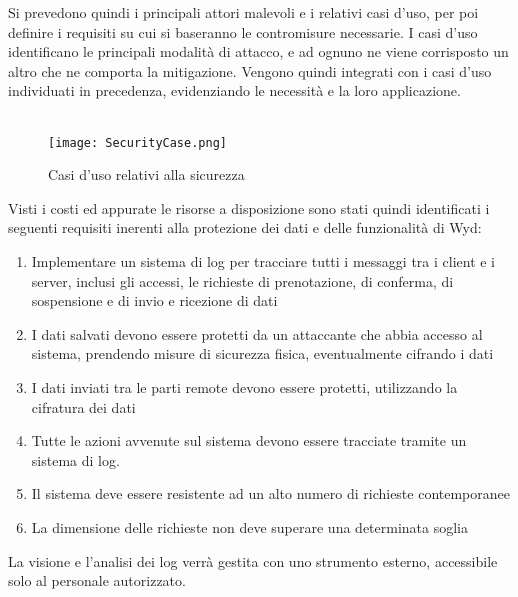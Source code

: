 \clearpage
Si prevedono quindi i principali attori malevoli e i relativi casi d'uso, 
per poi definire i requisiti su cui si baseranno le contromisure necessarie. 
I casi d'uso identificano le principali modalità di attacco, 
e ad ognuno ne viene corrisposto un altro che ne comporta la mitigazione. 
Vengono quindi integrati con i casi d'uso individuati in precedenza, 
evidenziando le necessità e la loro applicazione.\\
\\
\begin{figure}[h!]
    \begin{center}
        \texttt{[image: SecurityCase.png]}
        \caption{Casi d'uso relativi alla sicurezza}
    \end{center}

\end{figure}
\clearpage

Visti i costi ed appurate le risorse a disposizione sono stati quindi identificati i seguenti requisiti 
inerenti alla protezione dei dati e delle funzionalità di Wyd:
\begin{enumerate}
    \item Implementare un sistema di log per tracciare tutti i messaggi tra i client e i server, inclusi gli accessi, le richieste di prenotazione, di conferma, di sospensione e di invio e ricezione di dati
    \item I dati salvati devono essere protetti da un attaccante che abbia accesso al sistema, prendendo misure di sicurezza fisica, eventualmente cifrando i dati
    \item I dati inviati tra le parti remote devono essere protetti, utilizzando la cifratura dei dati
    \item Tutte le azioni avvenute sul sistema devono essere tracciate tramite un sistema di log.
    \item Il sistema deve essere resistente ad un alto numero di richieste contemporanee
    \item La dimensione delle richieste non deve superare una determinata soglia
\end{enumerate}

La visione e l'analisi dei log verrà gestita con uno strumento esterno, accessibile solo al personale autorizzato.


